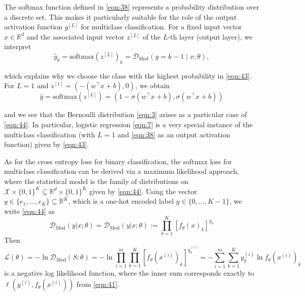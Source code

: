 The softmax function defined in \ref{eqn:38} represents a probability distribution over a discrete set. This makes it particularly suitable for the role of the output activation function $g^{[L]}$ for multiclass
classification. For a fixed input vector $x \in \mathbb{R}^d$ and the associated input vector $z^{[L]}$ of the $L$-th layer (output layer), we interpret
\begin{equation}
    \hat{y}_k = \text{softmax}(z^{[L]})_k = \mathcal{D}_{\text{Mod}}(y = k - 1 \mid x; \theta),
    \label{eqn:44}
\end{equation}

which explains why we choose the class with the highest probability in \ref{eqn:43}.\\

For $L=1$ and $z^{[1]} = (-(w^\top x + b),0)$, we obtain
\begin{equation}
\hat{y} = \text{softmax}(z^{[L]}) = \left(1 - \sigma(w^\top x + b), \sigma(w^\top x + b)\right)
\label{eqn:45}
\end{equation}

and we see that the Bernoulli distribution \ref{eqn:3} arises as a particular case of \ref{eqn:44}. In particular, logistic regression \ref{eqn:7} is a very special instance of the multiclass classification (with $L = 1$ and \ref{eqn:38} as an output activation function) given by \ref{eqn:43}.

\begin{remark}
As for the cross entropy loss for binary classification, the softmax loss for multiclass classification can be derived via a maximum likelihood approach, where the statistical model is the family of distributions on $\mathcal{X} \times \{0, 1\}^K \subseteq \mathbb{R}^d \times \{0, 1\}^K$ given by \ref{eqn:44}. Using the vector $y \in \{e_1, \ldots, e_K\} \subseteq \mathbb{R}^K$, which is a one-hot encoded label $y \in \{0, \ldots, K-1\}$, we write \ref{eqn:44} as
\begin{equation}
    \mathcal{D}_{\text{Mod}}(y|x;\theta) = \mathcal{D}_{\text{Mod}}(y|x;\theta) := \prod_{k=1}^{K} [f_{\theta}(x)_{k}]^{y_k}
    \label{eqn:46}
\end{equation}
Then
\begin{equation}
    \mathcal{L}(\theta) = -\ln \mathcal{D}_{\text{Mod}}(S ; \theta) = -\ln \prod_{i=1}^{m} \prod_{k=1}^{K} \left[ f_\theta(x^{(i)})_k \right]^{y_k^{(i)}} = - \sum_{i=1}^{m} \sum_{k=1}^{K} y_k^{(i)} \ln f_\theta(x^{(i)})_k
    \label{eqn:47}
\end{equation}
is a negative log likelihood function, where the inner sum corresponds exactly to $\ell(y^{(i)}, f_{\theta}(x^{(i)}))$ from \ref{eqn:41}.
\end{remark}

